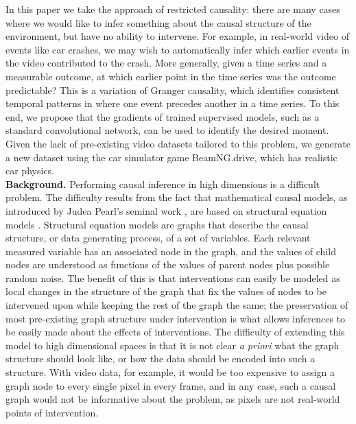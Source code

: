 \documentclass[letterpaper, twocolumn]{article} %
\begin{document}
In this paper we take the approach of restricted causality: there are many cases where we would like to infer something about the causal structure of the environment, but have no ability to intervene. For example, in real-world video of events like car crashes, we may wish to automatically infer which earlier events in the video contributed to the crash. More generally, given a time series and a measurable outcome, at which earlier point in the time series was the outcome predictable? This is a variation of Granger causality, which identifies consistent temporal patterns in where one event precedes another in a time series. To this end, we propose that the gradients of trained supervised models, such as a standard convolutional network, can be used to identify the desired moment. Given the lack of pre-existing video datasets tailored to this problem, we generate a new dataset using the car simulator game BeamNG.drive, which has realistic car physics. \\


\noindent \textbf{Background.} Performing causal inference in high dimensions is a difficult problem. The difficulty results from the fact that mathematical causal models, as introduced by Judea Pearl's seminal work \cite{pearl2009causalitybook}, are based on structural equation models \cite{duncan2014introduction}. Structural equation models are graphs that describe the causal structure, or data generating process, of a set of variables.  Each relevant measured variable has an associated node in the graph, and the values of child nodes are understood as functions of the values of parent nodes plus possible random noise. The benefit of this is that interventions can easily be modeled as local changes in the structure of the graph that fix the values of nodes to be intervened upon while keeping the rest of the graph the same; the preservation of most pre-existing graph structure under intervention is what allows inferences to be easily made about the effects of interventions. The difficulty of extending this model to high dimensional spaces is that it is not clear \emph{a priori} what the graph structure should look like, or how the data should be encoded into such a structure. With video data, for example, it would be too expensive to assign a graph node to every single pixel in every frame, and in any case, such a causal graph would not be informative about the problem, as pixels are not real-world points of intervention.
\end{document}
